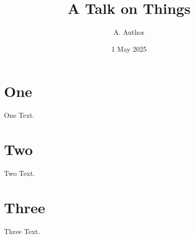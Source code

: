 \documentclass{beamer}
\title[Short]{A Talk on Things}
\author{A. Author}
\institute{Institute}
\date{1 May 2025}
\begin{document}
\section{One}
\begin{frame}{One}
Text.
\end{frame}
\section{Two}
\begin{frame}{Two}
Text.
\end{frame}
\section{Three}
\begin{frame}{Three}
Text.
\end{frame}
\end{document}

